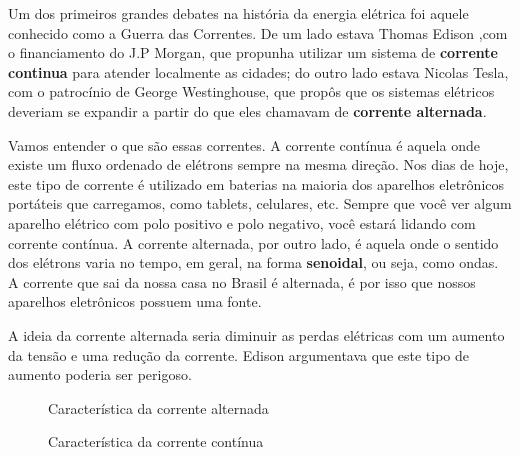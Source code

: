 Um dos primeiros grandes debates na história da energia elétrica foi aquele conhecido como a Guerra das Correntes. De um lado estava Thomas
Edison ,com o financiamento do J.P Morgan, que propunha utilizar um
sistema de \textbf{corrente continua} para atender localmente as cidades; do outro lado estava Nicolas
Tesla, com o patrocínio de George Westinghouse, que propôs que
os sistemas elétricos deveriam se expandir a partir do que eles chamavam
de \textbf{corrente alternada}. 

Vamos entender o que são essas correntes. A corrente contínua é aquela onde existe um fluxo ordenado de elétrons sempre na mesma direção. Nos dias de hoje, este tipo de corrente é utilizado em baterias na maioria dos aparelhos eletrônicos portáteis que carregamos, como tablets, celulares, etc. Sempre que você ver algum aparelho elétrico com polo positivo e polo negativo, você estará lidando com corrente contínua. A corrente alternada, por outro lado, é aquela onde o sentido dos elétrons varia no tempo, em geral, na forma \textbf{senoidal}, ou seja, como ondas. A corrente que sai da nossa casa no Brasil é alternada, é por isso que nossos aparelhos eletrônicos possuem uma fonte. 

A ideia da corrente alternada seria diminuir as perdas elétricas com um aumento da tensão e uma redução da corrente. Edison argumentava que este tipo de aumento poderia ser perigoso.


\begin{figure}[H]
\begin{center}
\caption{\label{fig:corrente-alternada} Característica da corrente alternada}
\end{center}
\end{figure}




\begin{figure}[H]
\begin{center}
\caption{\label{fig:corrente-continua}Característica da corrente contínua}
\end{center}
\end{figure}


